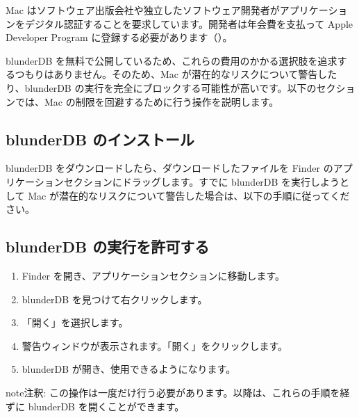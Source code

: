 \documentclass[letterpaper,10pt,dvipdfmx]{sphinxmanual}
\begin{document}
\sphinxAtStartPar
Mac はソフトウェア出版会社や独立したソフトウェア開発者がアプリケーションをデジタル認証することを要求しています。開発者は年会費を支払って Apple Developer Program に登録する必要があります（）。

\sphinxAtStartPar
blunderDB を無料で公開しているため、これらの費用のかかる選択肢を追求するつもりはありません。そのため、Mac が潜在的なリスクについて警告したり、blunderDB の実行を完全にブロックする可能性が高いです。以下のセクションでは、Mac の制限を回避するために行う操作を説明します。


\subsection{blunderDB のインストール}
\label{\detokenize{annexe_mac_securite:installation-de-blunderdb}}
\sphinxAtStartPar
blunderDB をダウンロードしたら、ダウンロードしたファイルを Finder のアプリケーションセクションにドラッグします。すでに blunderDB を実行しようとして Mac が潜在的なリスクについて警告した場合は、以下の手順に従ってください。


\subsection{blunderDB の実行を許可する}
\label{\detokenize{annexe_mac_securite:autorisation-de-l-execution-de-blunderdb}}\begin{enumerate}
%
\item {} 
\sphinxAtStartPar
Finder を開き、アプリケーションセクションに移動します。

\item {} 
\sphinxAtStartPar
blunderDB を見つけて右クリックします。

\item {} 
\sphinxAtStartPar
「開く」を選択します。

\item {} 
\sphinxAtStartPar
警告ウィンドウが表示されます。「開く」をクリックします。

\item {} 
\sphinxAtStartPar
blunderDB が開き、使用できるようになります。

\end{enumerate}

\begin{sphinxadmonition}{note}{注釈:}
\sphinxAtStartPar
この操作は一度だけ行う必要があります。以降は、これらの手順を経ずに blunderDB を開くことができます。
\end{sphinxadmonition}
\end{document}
